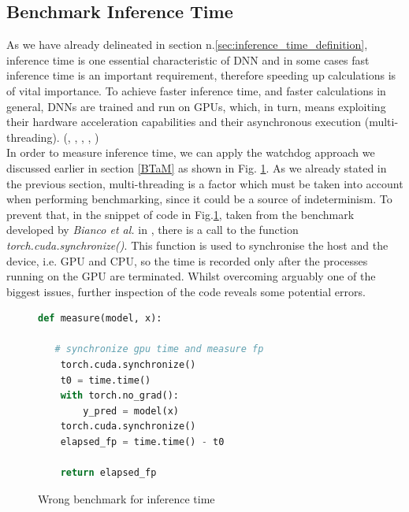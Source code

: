 \subsection{Benchmark Inference Time}\label{sec:ben_inf}
As we have already delineated in section n.\ref{sec:inference_time_definition}, inference time is one essential characteristic of DNN and in some cases fast inference time is an important requirement, therefore speeding up calculations is of vital importance. To achieve faster inference time, and faster calculations in general, DNNs are trained and run on GPUs, which, in turn, means exploiting their hardware acceleration capabilities and their asynchronous execution (multi-threading).  (\cite{8090194}, \cite{10.1007/978-3-642-04274-4_39}, \cite{10.1145/3089801.3089804}, \cite{paine2013gpu}, \cite{OH20041311})\\
In order to measure inference time, we can apply the watchdog approach we discussed earlier in section \ref{BTaM} as shown in Fig. \ref{fig:wrong_inf}. As we already stated in the previous section, multi-threading is a factor which must be taken into account when performing benchmarking, since it could be a source of indeterminism. To prevent that, in the snippet of code in Fig.\ref{fig:wrong_inf}, taken from the benchmark developed by \textit{Bianco et al.} in \cite{bianco2018dnnsbench}, there is a call to the function \textit{torch.cuda.synchronize()}. This function is used to synchronise the host and the device, i.e. GPU and CPU, so the time is recorded only after the processes running on the GPU are terminated. Whilst overcoming arguably one of the biggest issues, further inspection of the code reveals some potential errors.\\
\begin{figure}[h]
\begin{lstlisting}[language=python]
def measure(model, x):

   # synchronize gpu time and measure fp
	torch.cuda.synchronize()
	t0 = time.time()
	with torch.no_grad():
		y_pred = model(x)
	torch.cuda.synchronize()
	elapsed_fp = time.time() - t0
	
	return elapsed_fp

\end{lstlisting}
\caption[Wrong benchmark for inference time]{Wrong benchmark for inference time \cite{bianco2018dnnsbench}}
\label{fig:wrong_inf}
\end{figure}




